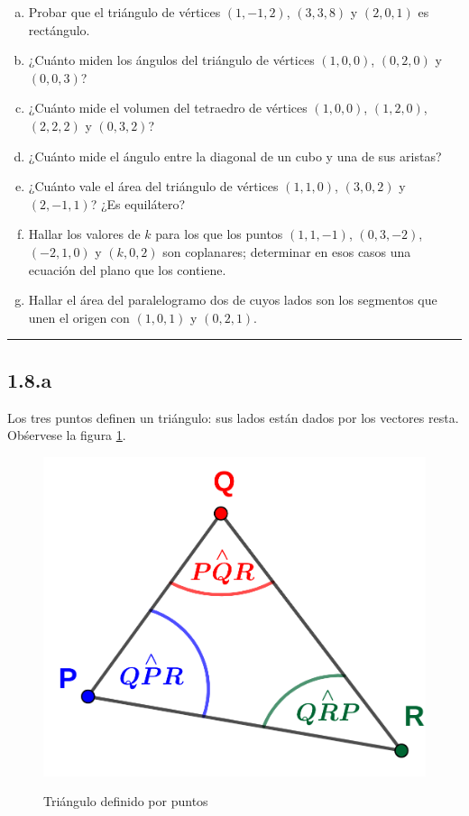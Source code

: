 \documentclass{article}
\begin{document}
\begin{enumerate}[(a)]
\bfseries
\item Probar que el triángulo de vértices $(1, -1, 2)$, $(3, 3, 8)$ y $(2, 0, 1)$ es rectángulo.

\item ¿Cuánto miden los ángulos del triángulo de vértices $(1, 0, 0)$, $(0, 2, 0)$ y $(0, 0, 3)$?

\item ¿Cuánto mide el volumen del tetraedro de vértices $(1, 0, 0)$, $(1, 2, 0)$, $(2, 2, 2)$ y $(0, 3, 2)$?

\item ¿Cuánto mide el ángulo entre la diagonal de un cubo y una de sus aristas?

\item ¿Cuánto vale el área del triángulo de vértices $(1, 1, 0)$, $(3, 0, 2)$ y $(2, -1, 1)$? ¿Es equilátero?

\item Hallar los valores de $k$ para los que los puntos $(1, 1, -1)$, $(0, 3, -2)$, $(-2, 1, 0)$ y $(k, 0, 2)$ son coplanares; determinar en esos casos una ecuación del plano que los contiene.

\item Hallar el área del paralelogramo dos de cuyos lados son los segmentos que unen el origen con $(1, 0, 1)$ y $(0, 2, 1)$.
\end{enumerate}
\hrule

\subsection*{1.8.a}
\label{subsec:1.8.a}

Los tres puntos definen un triángulo: sus lados están dados por los vectores resta. Obśervese la figura \ref{fig:1-8-a}.

\begin{figure}[ht]
\caption{Triángulo definido por puntos}
\includegraphics[scale=1]{../img/exercises/guide_01/08_a.png} 
\centering
\label{fig:1-8-a}
\end{figure}
\end{document}
